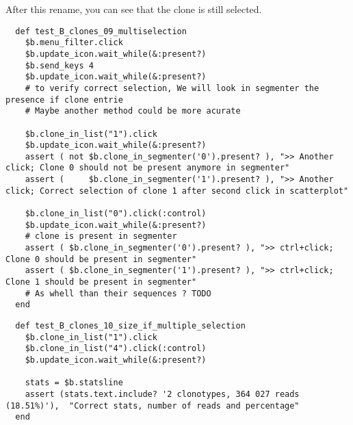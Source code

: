\bigskip

After this rename, you can see that the clone is still selected.
\begin{verbatim}
  def test_B_clones_09_multiselection
    $b.menu_filter.click
    $b.update_icon.wait_while(&:present?)
    $b.send_keys 4
    $b.update_icon.wait_while(&:present?)
    # to verify correct selection, We will look in segmenter the presence if clone entrie
    # Maybe another method could be more acurate
    
    $b.clone_in_list("1").click
    $b.update_icon.wait_while(&:present?)
    assert ( not $b.clone_in_segmenter('0').present? ), ">> Another click; Clone 0 should not be present anymore in segmenter"
    assert (     $b.clone_in_segmenter('1').present? ), ">> Another click; Correct selection of clone 1 after second click in scatterplot"
   
    $b.clone_in_list("0").click(:control)
    $b.update_icon.wait_while(&:present?)
    # clone is present in segmenter
    assert ( $b.clone_in_segmenter('0').present? ), ">> ctrl+click; Clone 0 should be present in segmenter"
    assert ( $b.clone_in_segmenter('1').present? ), ">> ctrl+click; Clone 1 should be present in segmenter"
    # As whell than their sequences ? TODO
  end
\end{verbatim}

\begin{verbatim}
  def test_B_clones_10_size_if_multiple_selection
    $b.clone_in_list("1").click
    $b.clone_in_list("4").click(:control)
    $b.update_icon.wait_while(&:present?)

    stats = $b.statsline
    assert (stats.text.include? '2 clonotypes, 364 027 reads (18.51%)'),  "Correct stats, number of reads and percentage"
  end
\end{verbatim}

